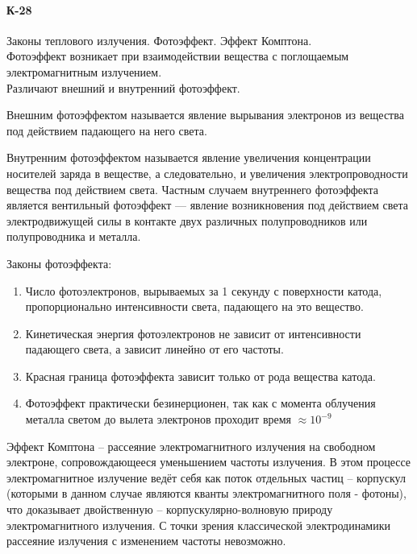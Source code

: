 \documentclass[__main__.tex]{subfiles}
\begin{document}
\paragraph{К-28}
Законы теплового излучения. Фотоэффект. Эффект Комптона.\\

Фотоэффект возникает при взаимодействии вещества с поглощаемым электромагнитным излучением.\\

Различают внешний и внутренний фотоэффект.

\begin{definition}
	Внешним фотоэффектом называется явление вырывания электронов из вещества под действием падающего на него света.
\end{definition}

\begin{definition}
	Внутренним фотоэффектом называется явление увеличения концентрации носителей заряда в веществе, а следовательно, и увеличения электропроводности вещества под действием света. Частным случаем внутреннего фотоэффекта является вентильный фотоэффект — явление возникновения под действием света электродвижущей силы в контакте двух различных полупроводников или полупроводника и металла.
\end{definition}

Законы фотоэффекта:

\begin{enumerate}
	\item Число фотоэлектронов, вырываемых за 1 секунду с поверхности катода, пропорционально интенсивности света, падающего на это вещество.
	\item Кинетическая энергия фотоэлектронов не зависит от интенсивности падающего света, а зависит линейно от его частоты.
	\item Красная граница фотоэффекта зависит только от рода вещества катода.
	\item Фотоэффект практически безинерционен, так как с момента облучения металла светом до вылета электронов проходит время $\approx 10^{-9}$
\end{enumerate}

\begin{definition}
	Эффект Комптона – рассеяние электромагнитного излучения на свободном электроне, сопровождающееся уменьшением частоты излучения. В этом процессе электромагнитное излучение ведёт себя как поток отдельных частиц – корпускул (которыми в данном случае являются кванты электромагнитного поля - фотоны), что доказывает двойственную – корпускулярно-волновую природу электромагнитного излучения. С точки зрения классической электродинамики рассеяние излучения с изменением частоты невозможно.
\end{definition}
\end{document}

